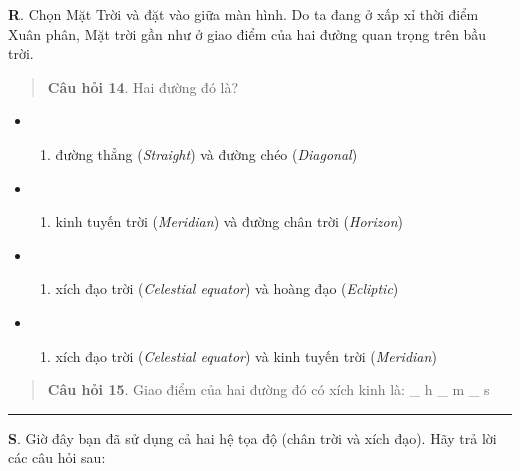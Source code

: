 \documentclass[
  a4paper,
]{book}
\providecommand{\tightlist}{%
  \setlength{\itemsep}{0pt}\setlength{\parskip}{0pt}}
\begin{document}
\textbf{R}. Chọn Mặt Trời và đặt vào giữa màn hình. Do ta đang ở xấp xỉ thời điểm Xuân phân, Mặt trời gần như ở giao điểm của hai đường quan trọng trên bầu trời.

\begin{quote}
\textbf{Câu hỏi 14}. Hai đường đó là?
\end{quote}

\begin{itemize}
\tightlist
\item
  \begin{enumerate}
  \def\labelenumi{(\Alph{enumi})}
  \tightlist
  \item
    đường thẳng (\emph{Straight}) và đường chéo (\emph{Diagonal})\\
  \end{enumerate}
\item
  \begin{enumerate}
  \def\labelenumi{(\Alph{enumi})}
  \setcounter{enumi}{1}
  \tightlist
  \item
    kinh tuyến trời (\emph{Meridian}) và đường chân trời (\emph{Horizon})\\
  \end{enumerate}
\item
  \begin{enumerate}
  \def\labelenumi{(\Alph{enumi})}
  \setcounter{enumi}{2}
  \tightlist
  \item
    xích đạo trời (\emph{Celestial equator}) và hoàng đạo (\emph{Ecliptic})\\
  \end{enumerate}
\item
  \begin{enumerate}
  \def\labelenumi{(\Alph{enumi})}
  \setcounter{enumi}{3}
  \tightlist
  \item
    xích đạo trời (\emph{Celestial equator}) và kinh tuyến trời (\emph{Meridian})
  \end{enumerate}
\end{itemize}

\begin{quote}
\textbf{Câu hỏi 15}. Giao điểm của hai đường đó có xích kinh là:
\_ h
\_ m
\_ s
\end{quote}

\begin{center}\rule{0.5\linewidth}{0.5pt}\end{center}

\textbf{S}. Giờ đây bạn đã sử dụng cả hai hệ tọa độ (chân trời và xích đạo). Hãy trả lời các câu hỏi sau:
\end{document}
